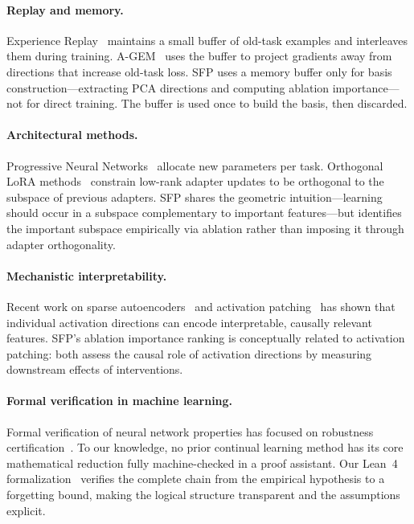 \paragraph{Replay and memory.}
Experience Replay~\citep{chaudhry2019tiny} maintains a small buffer of old-task examples and interleaves them during training.
A-GEM~\citep{chaudhry2018efficient} uses the buffer to project gradients away from directions that increase old-task loss.
SFP uses a memory buffer only for basis construction---extracting PCA directions and computing ablation importance---not for direct training.
The buffer is used once to build the basis, then discarded.

\paragraph{Architectural methods.}
Progressive Neural Networks~\citep{rusu2016progressive} allocate new parameters per task.
Orthogonal LoRA methods~\citep{qin2024exploring} constrain low-rank adapter updates to be orthogonal to the subspace of previous adapters.
SFP shares the geometric intuition---learning should occur in a subspace complementary to important features---but identifies the important subspace empirically via ablation rather than imposing it through adapter orthogonality.

\paragraph{Mechanistic interpretability.}
Recent work on sparse autoencoders~\citep{bricken2023monosemanticity, cunningham2023sparse} and activation patching~\citep{meng2022locating, wang2023interpretability} has shown that individual activation directions can encode interpretable, causally relevant features.
SFP's ablation importance ranking is conceptually related to activation patching: both assess the causal role of activation directions by measuring downstream effects of interventions.

\paragraph{Formal verification in machine learning.}
Formal verification of neural network properties has focused on robustness certification~\citep{katz2017reluplex, wong2018provable}.
To our knowledge, no prior continual learning method has its core mathematical reduction fully machine-checked in a proof assistant.
Our Lean~4 formalization~\citep{mathlib2020} verifies the complete chain from the empirical hypothesis to a forgetting bound, making the logical structure transparent and the assumptions explicit.

